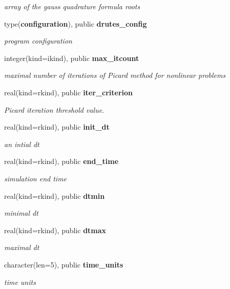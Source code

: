 \begin{DoxyCompactItemize}
\begin{DoxyCompactList}\small\item\em array of the gauss quadrature formula roots \end{DoxyCompactList}\item 
type({\bf configuration}), public {\bf drutes\+\_\+config}
\begin{DoxyCompactList}\small\item\em program configuration \end{DoxyCompactList}\item 
integer(kind=ikind), public {\bf max\+\_\+itcount}
\begin{DoxyCompactList}\small\item\em maximal number of iterations of Picard method for nonlinear problems \end{DoxyCompactList}\item 
real(kind=rkind), public {\bf iter\+\_\+criterion}
\begin{DoxyCompactList}\small\item\em Picard iteration threshold value. \end{DoxyCompactList}\item 
real(kind=rkind), public {\bf init\+\_\+dt}
\begin{DoxyCompactList}\small\item\em an intial dt \end{DoxyCompactList}\item 
real(kind=rkind), public {\bf end\+\_\+time}
\begin{DoxyCompactList}\small\item\em simulation end time \end{DoxyCompactList}\item 
real(kind=rkind), public {\bf dtmin}
\begin{DoxyCompactList}\small\item\em minimal dt \end{DoxyCompactList}\item 
real(kind=rkind), public {\bf dtmax}
\begin{DoxyCompactList}\small\item\em maximal dt \end{DoxyCompactList}\item 
character(len=5), public {\bf time\+\_\+units}
\begin{DoxyCompactList}\small\item\em time units \end{DoxyCompactList}\item 

\end{DoxyCompactItemize}
